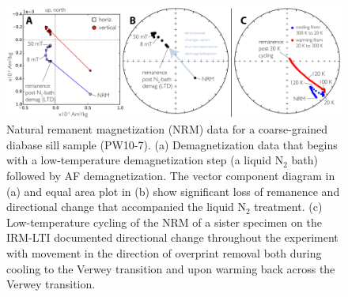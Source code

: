 \documentclass[draft,gc]{AGUTeX}
\begin{document}
\begin{figure}
\noindent\includegraphics[width=\textwidth]{Umkondo_PW10_NRM.pdf}
\caption{Natural remanent magnetization (NRM) data for a coarse-grained diabase sill sample (PW10-7). (a) Demagnetization data that begins with a low-temperature demagnetization step (a liquid N$_2$ bath) followed by AF demagnetization. The vector component diagram in (a) and equal area plot in (b) show significant loss of remanence and directional change that accompanied the liquid N$_2$ treatment. (c) Low-temperature cycling of the NRM of a sister specimen on the IRM-LTI documented  directional change throughout the experiment with movement in the direction of overprint removal both during cooling  to the Verwey transition and upon warming back across the Verwey transition.}
\label{fig:Umkondo_PW10NRM}
\end{figure}
\end{document}
